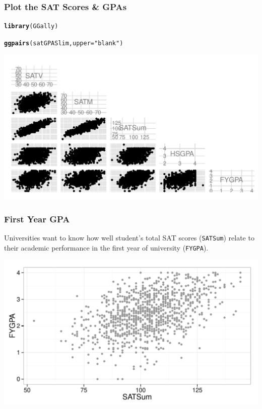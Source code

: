 \documentclass{beamer}\usepackage{graphicx, color}
\makeatletter
\def\maxwidth{ %
  \ifdim\Gin@nat@width>\linewidth
    \linewidth
  \else
    \Gin@nat@width
  \fi
}
\newcommand{\hlfunctioncall}[1]{\textcolor[rgb]{0.501960784313725,0,0.329411764705882}{\textbf{#1}}}%
\newcommand{\hlstring}[1]{\textcolor[rgb]{0.6,0.6,1}{#1}}%
\newenvironment{kframe}{%
 \def\at@end@of@kframe{}%
 \ifinner\ifhmode%
  \def\at@end@of@kframe{\end{minipage}}%
  \begin{minipage}{\columnwidth}%
 \fi\fi%
 \def\FrameCommand##1{\hskip\@totalleftmargin \hskip-\fboxsep
 \colorbox{shadecolor}{##1}\hskip-\fboxsep
     \hskip-\linewidth \hskip-\@totalleftmargin \hskip\columnwidth}%
 \MakeFramed {\advance\hsize-\width
   \@totalleftmargin\z@ \linewidth\hsize
   \@setminipage}}%
 {\par\unskip\endMakeFramed%
 \at@end@of@kframe}
\newenvironment{knitrout}{}{} %
\makeatother
\begin{document}
\begin{frame}[fragile]
  \frametitle{Plot the SAT Scores \& GPAs}
\begin{knitrout}
\color{fgcolor}\begin{kframe}
\begin{alltt}
\hlfunctioncall{library}(GGally)

\hlfunctioncall{ggpairs}(satGPASlim, upper = \hlstring{"blank"})
\end{alltt}
\end{kframe}

{\centering \includegraphics[width=\maxwidth]{figure/DescribeGPA} 

}


\end{knitrout}

\end{frame}

\begin{frame}[fragile]
  \frametitle{First Year GPA}
  Universities want to know how well student's total SAT scores (\texttt{SATSum}) relate to their academic performance in the first year of university (\texttt{FYGPA}).
\begin{knitrout}
\color{fgcolor}

{\centering \includegraphics[width=\maxwidth]{figure/SATFYGPA} 

}


\end{knitrout}

\end{frame}
\end{document}
